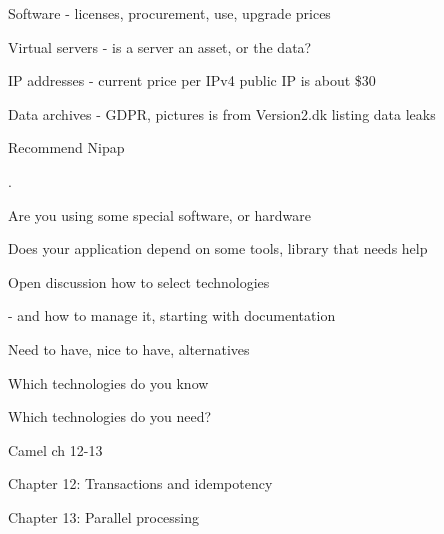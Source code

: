 \documentclass[Screen16to9,17pt]{foils}
\begin{document}


\begin{list2}
\item Software - licenses, procurement, use, upgrade prices
\item Virtual servers - is a server an asset, or the data?
\item IP addresses - current price per IPv4 public IP is about \$30
\item Data archives - GDPR, pictures is from Version2.dk listing data leaks
\end{list2}


\begin{list2}
\item Recommend Nipap 
\end{list2}


.

\begin{list2}
\item Are you using some special software, or hardware
\item Does your application depend on some tools, library that needs help
\end{list2}




\begin{list2}
\item Open discussion how to select technologies
\item - and how to manage it, starting with documentation
\item Need to have, nice to have, alternatives
\item Which technologies do you know
\item Which technologies do you need?
\end{list2}







\begin{list1}
\item Camel ch 12-13
\item Chapter 12: Transactions and idempotency
\item Chapter 13: Parallel processing
\end{list1}
\end{document}
